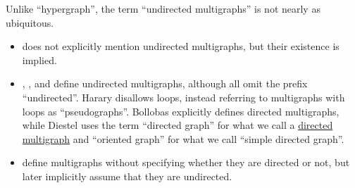 \begin{comments}
  \item Unlike \enquote{hypergraph}, the term \enquote{undirected multigraphs} is not nearly as ubiquitous.
  \begin{itemize}
    \item {} does not explicitly mention undirected multigraphs, but their existence is implied.

    \item {}, ,  and  define undirected multigraphs, although all omit the prefix \enquote{undirected}. Harary disallows loops, instead referring to multigraphs with loops as \enquote{pseudographs}. Bollobas explicitly defines directed multigraphs, while Diestel uses the term \enquote{directed graph} for what we call a \hyperref[def:directed_multigraph]{directed multigraph} and \enquote{oriented graph} for what we call \enquote{simple directed graph}.

    \item {} define multigraphs without specifying whether they are directed or not, but later implicitly assume that they are undirected.
  \end{itemize}
\end{comments}

